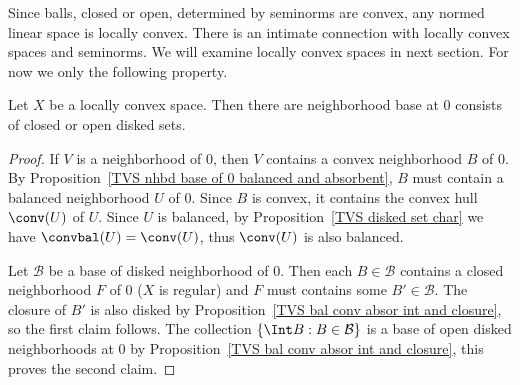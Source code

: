 Since balls, closed or open, determined by seminorms are convex, any normed linear space is locally convex. There is an intimate connection with locally convex spaces and seminorms. We will examine locally convex spaces in next section. For now we only the following property.
\begin{proposition}\label{LCS nbhd of disked sets}
Let $X$ be a locally convex space. Then there are neighborhood base at $0$ consists of closed or open disked sets.
\end{proposition}
\begin{proof}
If $V$ is a neighborhood of $0$, then $V$ contains a convex neighborhood $B$ of $0$. By Proposition~\ref{TVS nhbd base of 0 balanced and absorbent}, $B$ must contain a balanced neighborhood $U$ of $0$. Since $B$ is convex, it contains the convex hull $\conv(U)$ of $U$. Since $U$ is balanced, by Proposition~\ref{TVS disked set char} we have $\convbal(U)=\conv(U)$, thus $\conv(U)$ is also balanced.\par
Let $\mathcal{B}$ be a base of disked neighborhood of $0$. Then each $B\in\mathcal{B}$ contains a closed neighborhood $F$ of $0$ ($X$ is regular) and $F$ must contains some $B'\in\mathcal{B}$. The closure of $B'$ is also disked by Proposition~\ref{TVS bal conv absor int and closure}, so the first claim follows. The collection $\{\Int B:B\in\mathcal{B}\}$ is a base of open disked neighborhoods at $0$ by Proposition~\ref{TVS bal conv absor int and closure}, this proves the second claim.
\end{proof}
